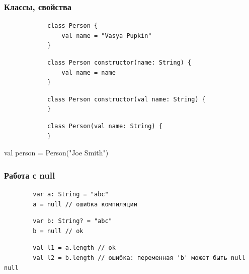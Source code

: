 \documentclass{beamer}
\begin{document}
\begin{frame}[fragile,t]
    \frametitle{Классы, свойства}
    \begin{overprint}
        \begin{verbatim}
            class Person {
                val name = "Vasya Pupkin"
            }
        \end{verbatim}

        \begin{verbatim}
            class Person constructor(name: String) {
                val name = name
            }
        \end{verbatim}

        \begin{verbatim}
            class Person constructor(val name: String) {
            }
        \end{verbatim}

        \begin{verbatim}
            class Person(val name: String) {
            }
        \end{verbatim}
        val person = Person("Joe Smith")
    \end{overprint}
\end{frame}

\begin{frame}[fragile,t]
    \frametitle{Работа с null}
    \begin{verbatim}
        var a: String = "abc"
        a = null // ошибка компиляции
    \end{verbatim}
    \begin{verbatim}
        var b: String? = "abc"
        b = null // ok
    \end{verbatim}
    \begin{verbatim}
        val l1 = a.length // ok
        val l2 = b.length // ошибка: переменная 'b' может быть null null
    \end{verbatim}
\end{frame}
\end{document}
